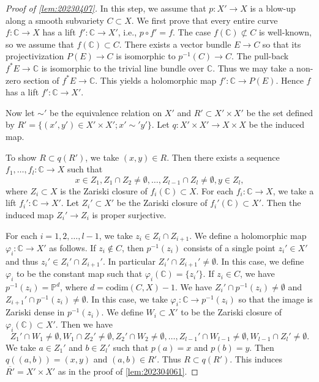 \documentclass[11pt,english]{smfart}
\theoremstyle{plain}
\theoremstyle{definition}
\theoremstyle{remark}
\numberwithin{equation}{subsection}
\theoremstyle{plain}
\begin{document}
\begin{proof}[Proof of \cref{lem:20230407}]
In this step, we assume that $p:X'\to X$ is a blow-up along a smooth subvariety $C\subset X$.
We first prove that every entire curve $f:\mathbb C\to X$ has a lift $f':\mathbb C\to X'$, i.e., $p\circ f'=f$.
The case $f(\mathbb C)\not\subset C$ is well-known, so we assume that $f(\mathbb C)\subset C$.
There exists a vector bundle $E\to C$ so that its projectivization $P(E)\to C$ is isomorphic to $p^{-1}(C)\to C$.
The pull-back $f^*E\to \mathbb C$ is isomorphic to the trivial line bundle over $\mathbb C$.
Thus we may take a non-zero section of $f^*E\to \mathbb C$.
This yields a holomorphic map $f':\mathbb C\to P(E)$.
Hence $f$ has a lift $f':\mathbb C\to X'$.



Now let $\sim'$ be the equivalence relation on $X'$ and $R'\subset X'\times X'$ be the set defined by $R'=\{(x',y')\in X'\times X'; x'\sim'y'\}$.
Let $q:X'\times X'\to X\times X$ be the induced map.



To show $R\subset q(R')$, we take $(x,y)\in R$.
Then there exists a sequence $f_1,\ldots,f_l:\mathbb C\to X$ such that 
$$x\in Z_1, Z_1\cap Z_2\not=\emptyset,\ldots,Z_{l-1}\cap Z_l\not=\emptyset, y\in Z_l,$$
where $Z_i\subset X$ is the Zariski closure of $f_i(\mathbb C)\subset X$.
For each $f_i:\mathbb C\to X$, we take a lift $f_i':\mathbb C\to X'$.
Let $Z_i'\subset X'$ be the Zariski closure of $f_i'(\mathbb C)\subset X'$.
Then the induced map $Z_i'\to Z_i$ is proper surjective.

For each $i=1,2,\ldots,l-1$, we take $z_i\in Z_i\cap Z_{i+1}$.
We define a holomorphic map $\varphi_i:\mathbb C\to X'$ as follows.
If $z_i\not\in C$, then $p^{-1}(z_i)$ consists of a single point $z_i'\in X'$ and thus $z_i'\in Z_i'\cap Z_{i+1}'$.
In particular $Z_i'\cap Z_{i+1}'\not=\emptyset$.
In this case, we define $\varphi_i$ to be the constant map such that $\varphi_i(\mathbb C)=\{z_i'\}$.
If $z_i\in C$, we have $p^{-1}(z_i)=\mathbb P^d$, where $d=\mathrm{codim}(C,X)-1$.
We have $Z_i'\cap p^{-1}(z_i)\not=\emptyset$ and $Z_{i+1}'\cap p^{-1}(z_i)\not=\emptyset$.
In this case, we take $\varphi_i:\mathbb C\to p^{-1}(z_i)$ so that the image is Zariski dense in $p^{-1}(z_i)$.
We define $W_i\subset X'$ to be the Zariski closure of $\varphi_i(\mathbb C)\subset X'$.
Then we have
$$
Z_1'\cap W_1\not=\emptyset, W_1\cap Z_2'\not=\emptyset, Z_2'\cap W_2\not=\emptyset, \ldots, Z_{l-1}'\cap W_{l-1}\not=\emptyset, W_{l-1}\cap Z_l'\not=\emptyset.
$$
We take $a\in Z_1'$ and $b\in Z_l'$ such that $p(a)=x$ and $p(b)=y$.
Then $q((a,b))=(x,y)$ and $(a,b)\in R'$.
Thus $R\subset q(R')$.
This induces $\overline{R'}= X'\times X'$ as in the proof of \cref{lem:202304061}.


\end{proof}
\end{document}
